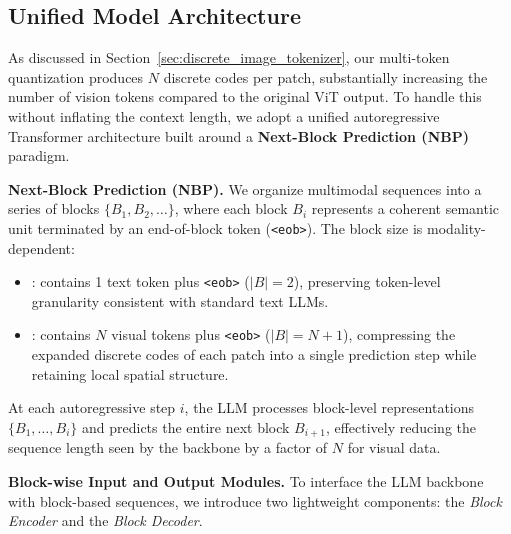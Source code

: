 \documentclass[11pt, a4paper, logo, copyright]{googledeepmind}
\begin{document}
\subsection{Unified Model Architecture}

As discussed in Section~\ref{sec:discrete_image_tokenizer}, our multi-token quantization produces $N$ discrete codes per patch, substantially increasing the number of vision tokens compared to the original ViT output. To handle this without inflating the context length, we adopt a unified autoregressive Transformer architecture built around a \textbf{Next-Block Prediction (NBP)} paradigm.

\textbf{Next-Block Prediction (NBP).}
We organize multimodal sequences into a series of blocks $\{B_1, B_2, \dots\}$, where each block $B_i$ represents a coherent semantic unit terminated by an end-of-block token (\texttt{<eob>}). The block size is modality-dependent: 
%
\begin{itemize}[noitemsep, topsep=2pt]
    \item {}: contains 1 text token plus \texttt{<eob>} ($|B|=2$), preserving token-level granularity consistent with standard text LLMs.
    \item {}: contains $N$ visual tokens plus \texttt{<eob>} ($|B|=N{+}1$), compressing the expanded discrete codes of each patch into a single prediction step while retaining local spatial structure.
\end{itemize}
At each autoregressive step $i$, the LLM processes block-level representations $\{B_1, \dots, B_i\}$ and predicts the entire next block $B_{i+1}$, effectively reducing the sequence length seen by the backbone by a factor of $N$ for visual data.


\textbf{Block-wise Input and Output Modules.}
To interface the LLM backbone with block-based sequences, we introduce two lightweight components: the \textit{Block Encoder} and the \textit{Block Decoder}. 
\end{document}
